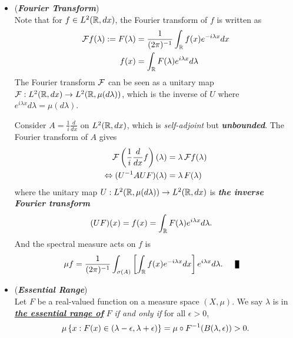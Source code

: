 \documentclass[11pt]{article}
\begin{document}
\begin{itemize}
\item \begin{example}  (\emph{\textbf{Fourier Transform}})\\
Note that for $f \in L^2({\mathbb R}, dx)$, the Fourier transform of $f$ is written as
\begin{align*}
{\mathcal F} f(\lambda) := F(\lambda)&=  \frac{1}{(2\pi)^{-1}}\int_{{\mathbb R}}f(x) e^{-i \lambda x} dx \\
f(x) &= \int_{{\mathbb R}} F(\lambda) e^{i \lambda x} d\lambda
\end{align*}
The Fourier transform ${\mathcal F}$ can be seen as a unitary map ${\mathcal F}: L^2({\mathbb R}, dx) \rightarrow  L^2({\mathbb R}, \mu(d\lambda))$, which is the inverse of $U$ where $ e^{i \lambda x} d\lambda = \mu(d\lambda)$.

Consider $A = \frac{1}{i}\frac{d}{dx}$ on $L^2({\mathbb R}, dx)$, which is \emph{self-adjoint} but \emph{\textbf{unbounded}}. The Fourier transform of $A$ gives
\begin{align*}
{\mathcal F}\left(\frac{1}{i}\frac{d}{dx}f\right)(\lambda) &= \lambda\,{\mathcal F} f(\lambda) \\
\Leftrightarrow (U^{-1}A UF)(\lambda) &= \lambda\, F(\lambda) 
\end{align*} where the unitary map $U: L^2({\mathbb R}, \mu(d\lambda)) \rightarrow  L^2({\mathbb R}, dx)$ is \emph{\textbf{the inverse Fourier transform}}
\begin{align*}
(UF)(x) = f(x) &=  \int_{{\mathbb R}} F(\lambda) e^{i \lambda x} d\lambda.
\end{align*}
And the spectral measure acts on $f$ is
\begin{align*}
\mu f &= \frac{1}{(2\pi)^{-1}}\int_{\sigma(A)} \brac{\int_{\bR}f(x) e^{-i \lambda x} dx}e^{i \lambda x} d\lambda. \qed
\end{align*} %

\end{example}

\item \begin{definition} (\emph{\textbf{Essential Range}})\\
Let $F$ be a real-valued function on a measure space $(X, \mu)$.  We say $\lambda$ is in \underline{\emph{\textbf{the essential range of}}} $F$ \emph{if and only if} for all $\epsilon > 0$,
\begin{align*}
\mu\left\{x: F(x) \in (\lambda - \epsilon, \lambda + \epsilon)\right\} = \mu \circ F^{-1}(B(\lambda, \epsilon)) >0.
\end{align*} 
\end{definition}


\end{itemize}
\end{document}
